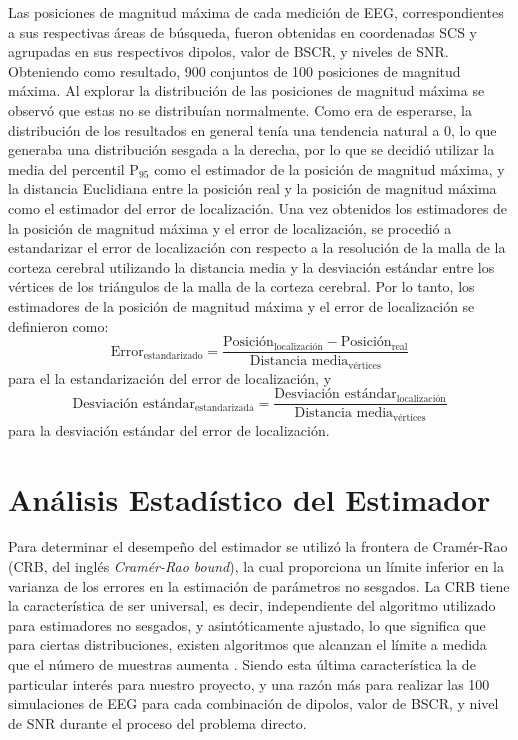 Las posiciones de magnitud máxima de cada medición de EEG, correspondientes a sus respectivas áreas de búsqueda, fueron obtenidas en coordenadas SCS y agrupadas en sus respectivos dipolos, valor de BSCR, y niveles de SNR.
Obteniendo como resultado, 900 conjuntos de 100 posiciones de magnitud máxima. 
Al explorar la distribución de las posiciones de magnitud máxima se observó que estas no se distribuían normalmente.
Como era de esperarse, la distribución de los resultados en general tenía una tendencia natural a 0, lo que generaba una distribución sesgada a la derecha, por lo que se decidió utilizar la media del percentil P$_{95}$ como el estimador de la posición de magnitud máxima, y la distancia Euclidiana entre la posición real y la posición de magnitud máxima como el estimador del error de localización.
Una vez obtenidos los estimadores de la posición de magnitud máxima y el error de localización, se procedió a estandarizar el error de localización con respecto a la resolución de la malla de la corteza cerebral utilizando la distancia media y la desviación estándar entre los vértices de los triángulos de la malla de la corteza cerebral.
Por lo tanto, los estimadores de la posición de magnitud máxima y el error de localización se definieron como:
\begin{equation}
	\label{eq:mean_error}
	\text{Error}_{\text{estandarizado}} = \frac{\text{Posición}_{\text{localización}}-\text{Posición}_{\text{real}}}{\text{Distancia media}_{\text{vértices}}}
\end{equation}
para el la estandarización del error de localización, y
\begin{equation}
	\label{eq:sd_error}
	\text{Desviación estándar}_{\text{estandarizada}} = \frac{\text{Desviación estándar}_{\text{localización}}}{\text{Distancia media}_{\text{vértices}}}
\end{equation}
para la desviación estándar del error de localización.

\section{Análisis Estadístico del Estimador}
\label{sec:methodology:cbr-analysis}

Para determinar el desempeño del estimador se utilizó la frontera de Cramér-Rao (CRB, del inglés \emph{Cramér-Rao bound}), la cual proporciona un límite inferior en la varianza de los errores en la estimación de parámetros no sesgados.
La CRB tiene la característica de ser universal, es decir, independiente del algoritmo utilizado para estimadores no sesgados, y asintóticamente ajustado, lo que significa que para ciertas distribuciones, existen algoritmos que alcanzan el límite a medida que el número de muestras aumenta \cite{Muravchik1999, Escalona-Vargas2013}.
Siendo esta última característica la de particular interés para nuestro proyecto, y una razón más para realizar las 100 simulaciones de EEG para cada combinación de dipolos, valor de BSCR, y nivel de SNR durante el proceso del problema directo.

